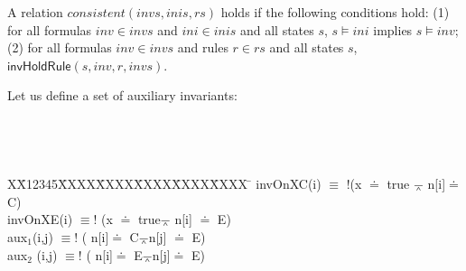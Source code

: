 \documentclass[conference]{IEEEtran}
\newlength{\fminilength}
\newenvironment{fmini}[1][\linewidth]
  {\setlength{\fminilength}{#1\fboxsep-2\fboxrule}%
   \vspace{2ex}\noindent\begin{lrbox}{\fminibox}\begin{minipage}{\fminilength}%
   \mbox{ }\hfill\vspace{-2.5ex}}%
  {\end{minipage}\end{lrbox}\vspace{1ex}\hspace{0ex}%
   \framebox{\usebox{\fminibox}}}
\newenvironment{specification}
{\noindent\scriptsize
\tt\begin{fmini}\begin{tabbing}X\=X12345\=XXXX\=XXXX\=XXXX\=XXXX\=XXXX
\=\+\kill} {\end{tabbing}\normalfont\end{fmini}}
\def \andc {\barwedge }
\def \negc {!}
\begin{document}
{\vspace{-5pt}
\begin{definition}
A relation $consistent( invs,inis, rs)$ holds if the following conditions hold: (1) for all formulas $inv\in invs$ and $ini\in inis$ and all states $s$, $s \models ini$ implies $s \models inv$; (2) for all formulas $inv\in invs$ and rules  $r \in rs$ and all states $s$,  $\mathsf{invHoldRule}(s, inv, r, invs   )$.
\end{definition}
\vspace{-10pt}




\begin{example}\label{example2}
Let us define a set of auxiliary invariants:

\begin{specification}
invOnXC(i)  $\equiv$ $\negc$(x $\doteq$ true $\andc$ n[i]$\doteq$ C)   \\

invOnXE(i)   $\equiv \negc$ (x $\doteq$ true$\andc$ n[i] $\doteq$ E)  \\


aux$_1$(i,j)   $\equiv \negc$ ( n[i]$\doteq$ C$\andc$n[j] $\doteq$ E)  \\

aux$_2$ (i,j) $\equiv \negc$  ( n[i]$\doteq$ E$\andc$n[j]$\doteq$ E)\\


\end{specification}
\end{example}}
\end{document}

